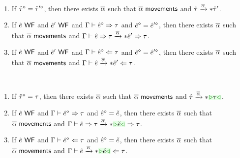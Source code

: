 \documentclass{article}
\begin{document}
\begin{theorem}[name=Reachability] \
  \begin{enumerate}
    \item If $\hat{\tau}^{\diamond} = \hat{\tau}'^{\diamond}$, then there exists $\overline{\alpha}$ such that
      $\overline{\alpha} ~{\normalfont\textsf{movements}}$ and $\hat{\tau} \xrightarrow{\overline{\alpha}}* \hat{\tau}'$.

    \item If $\hat{e} ~{\normalfont\textsf{WF}}$ and $\hat{e}' ~{\normalfont\textsf{WF}}$ and
      $\Gamma \vdash \hat{e}^{\diamond} \Rightarrow \tau$ and $\hat{e}^{\diamond} = \hat{e}'^{\diamond}$,
      then there exists $\overline{\alpha}$ such that $\overline{\alpha} ~{\normalfont\textsf{movements}}$ and
      $\Gamma \vdash \hat{e} \Rightarrow \tau \xrightarrow{\overline{\alpha}}* \hat{e}' \Rightarrow \tau$.

    \item If $\hat{e} ~{\normalfont\textsf{WF}}$ and $\hat{e}' ~{\normalfont\textsf{WF}}$ and
      $\Gamma \vdash \hat{e}^{\diamond} \Leftarrow \tau$ and $\hat{e}^{\diamond} = \hat{e}'^{\diamond}$,
      then there exists $\overline{\alpha}$ such that $\overline{\alpha} ~{\normalfont\textsf{movements}}$ and
      $\Gamma \vdash \hat{e} \xrightarrow{\overline{\alpha}}* \hat{e}' \Leftarrow \tau$.
  \end{enumerate}
\end{theorem}

\begin{lemma}[name=Reach Up] \
  \begin{enumerate}
    \item If $\hat{\tau}^{\diamond} = \tau$, then there exists $\overline{\alpha}$ such that $\overline{\alpha} ~{\normalfont\textsf{movements}}$
      and $\AUTActionIter{\ZTMV}{\ZTCursor{\TMV}}{\AIMV}$.

    \item If $\hat{e} ~{\normalfont\textsf{WF}}$ and $\Gamma \vdash \hat{e}^{\diamond} \Rightarrow \tau$ and
      $\hat{e}^{\diamond} = \check{e}$, then there exists $\overline{\alpha}$ such that $\overline{\alpha} ~{\normalfont\textsf{movements}}$ and
      $\ASEActionIter{\ctx}{\ZMV}{\TMV}{\ZTCursor{\ECMV}}{\TMV}{\AIMV}$.

    \item If $\hat{e} ~{\normalfont\textsf{WF}}$ and $\Gamma \vdash \hat{e}^{\diamond} \Leftarrow \tau$ and
      $\hat{e}^{\diamond} = \check{e}$, then there exists $\overline{\alpha}$ such that $\overline{\alpha} ~{\normalfont\textsf{movements}}$ and
      $\AAEActionIter{\ctx}{\ZMV}{\ZTCursor{\ECMV}}{\TMV}{\AIMV}$.
  \end{enumerate}
\end{lemma}
\end{document}
